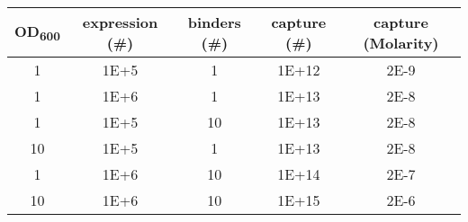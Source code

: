 \begin{tabular}{ccccc}
	\toprule
	OD\textsubscript{600} & expression (\#) & binders (\#) & capture (\#) & capture (Molarity) \\
	\midrule
	1 & 1E+5 & 1 & 1E+12 &  2E-9 \\
	1 & 1E+6 & 1 & 1E+13 &  2E-8 \\
	1 & 1E+5 & 10 & 1E+13 &  2E-8 \\
	10 & 1E+5 & 1 & 1E+13 &  2E-8 \\
	1 & 1E+6 & 10 & 1E+14 &  2E-7 \\
	10 & 1E+6 & 10 & 1E+15 & 2E-6 \\
	\bottomrule
\end{tabular}
